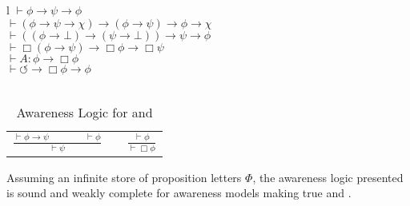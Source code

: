 \begin{table}[h]
  \begin{tabular}{l}
    $\vdash \phi \rightarrow \psi \rightarrow \phi$\\
    $\vdash (\phi \rightarrow \psi \rightarrow \chi) \rightarrow (\phi
    \rightarrow \psi) \rightarrow \phi \rightarrow \chi$\\
    $\vdash ((\phi \rightarrow \bot) \rightarrow (\psi \rightarrow \bot))
    \rightarrow \psi \rightarrow \phi$\\
    $\vdash \Box(\phi \rightarrow \psi) \rightarrow \Box \phi \rightarrow \Box
    \psi$\\
    $\vdash A : \phi \rightarrow \Box \phi$\\
    $\vdash \circlearrowleft \rightarrow \Box \phi \rightarrow \phi$\\
    \\
    \begin{tabular}{lll}
      $\frac{\vdash \phi \rightarrow \psi \hspace{4em} \vdash \phi}{\vdash
      \psi}$ & {\hspace{6em}} & $\frac{\vdash \phi}{\vdash \Box \phi}$
    \end{tabular}
  \end{tabular}
  \caption{\label{logic1}Awareness Logic for  and
  }
\end{table}

\begin{theorem}
  \label{completeness1}Assuming an infinite store of proposition letters
  $\Phi$, the awareness logic presented is sound and weakly complete for
  awareness models making true  and .
\end{theorem}



